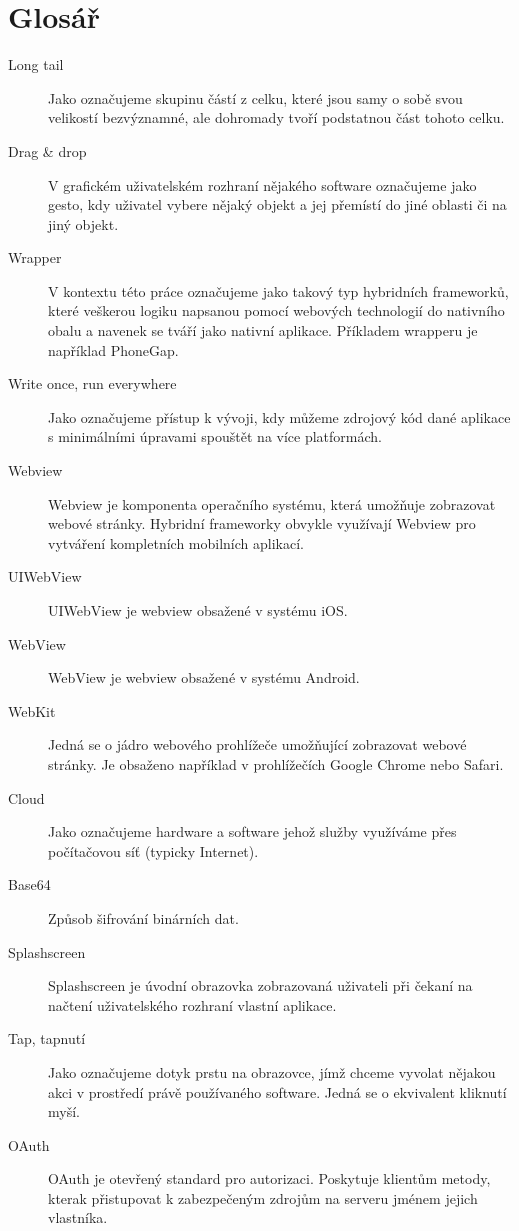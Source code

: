 \documentclass[thesis=B,czech]{FITthesis}[2012/06/26]
\begin{document}
\chapter{Glosář}
\begin{description}
	\item[Long tail] Jako  označujeme skupinu částí z celku, které jsou samy o sobě svou velikostí bezvýznamné, ale dohromady tvoří podstatnou část tohoto celku.
	\item[Drag \& drop] V grafickém uživatelském rozhraní nějakého software označujeme jako  gesto, kdy uživatel vybere nějaký objekt a  jej přemístí do jiné oblasti či na jiný objekt.
	\item[Wrapper] V kontextu této práce označujeme jako  takový typ hybridních frameworků, které veškerou logiku napsanou pomocí webových technologií  do nativního obalu a navenek se tváří jako nativní aplikace. Příkladem wrapperu je například PhoneGap.
	\item[Write once, run everywhere] Jako  označujeme přístup k vývoji, kdy můžeme zdrojový kód dané aplikace s minimálními úpravami spouštět na více platformách.
	\item[Webview] Webview je komponenta operačního systému, která umožňuje zobrazovat webové stránky. Hybridní frameworky obvykle využívají Webview pro vytváření kompletních mobilních aplikací.
	\item[UIWebView] UIWebView je webview obsažené v systému iOS.
	\item[WebView] WebView je webview obsažené v systému Android.
	\item[WebKit] Jedná se o jádro webového prohlížeče umožňující zobrazovat webové stránky. Je obsaženo například v prohlížečích Google Chrome nebo Safari.
	\item[Cloud] Jako  označujeme hardware a software jehož služby využíváme přes počítačovou síť (typicky Internet).
	\item[Base64] Způsob šifrování binárních dat.
	\item[Splashscreen] Splashscreen je úvodní obrazovka zobrazovaná uživateli při čekaní na načtení uživatelského rozhraní vlastní aplikace.
	\item[Tap, tapnutí] Jako  označujeme dotyk prstu na obrazovce, jímž chceme vyvolat nějakou akci v prostředí právě používaného software. Jedná se o ekvivalent kliknutí myší.
	\item[OAuth] OAuth je otevřený standard pro autorizaci. Poskytuje klientům metody, kterak přistupovat k zabezpečeným zdrojům na serveru jménem jejich vlastníka.
\end{description}
\end{document}
